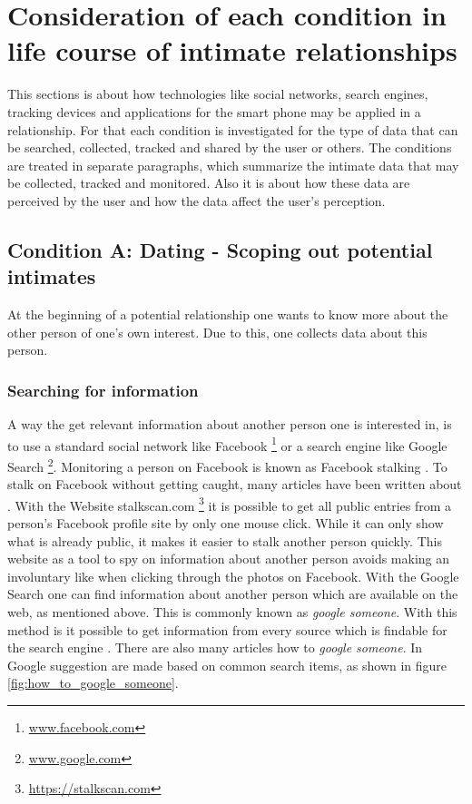 \section{Consideration of each condition in life course of intimate relationships}
\label{sec:consideration_life_course_conditions}
This sections is about how technologies like social networks, search engines, tracking devices and applications for the smart phone may be applied in a relationship.
For that each condition is investigated for the type of data that can be searched, collected, tracked and shared by the user or others.
The conditions are treated in separate paragraphs, which summarize the intimate data that may be collected, tracked and monitored. Also it is about how these data are perceived by the user and how the data affect the user's perception.

\subsection{Condition A: Dating - Scoping out potential intimates}
\label{subsec:A}
At the beginning of a potential relationship one wants to know more about the other person of one's own interest. Due to this, one collects data about this person. 
\subsubsection{Searching for information}
A way the get relevant information about another person one is interested in, is to use a standard social network like Facebook \footnote{\url{www.facebook.com}} or a search engine like Google Search \footnote{\url{www.google.com}}.
Monitoring a person on Facebook is known as Facebook stalking \cite{levy2014intimate}. To stalk on Facebook without getting caught, many articles have been written about \cite{sueddeutsche_fb_stalking}. With the Website stalkscan.com \footnote{\url{https://stalkscan.com}} it is possible to get all public entries from a person's Facebook profile site by only one mouse click. While it can only show what is already public, it makes it easier to stalk another person quickly.
This website as a tool to spy on information about another person avoids making an involuntary like when clicking through the photos on Facebook.
With the Google Search one can find information about another person which are available on the web, as mentioned above. This is commonly known as \textit{google someone}. With this method is it possible to get information from every source which is findable for the search engine \cite{nolan2005hacking}. There are also many articles how to \textit{google someone}. In Google suggestion are made based on common search items, as shown in figure \ref{fig:how_to_google_someone}.

